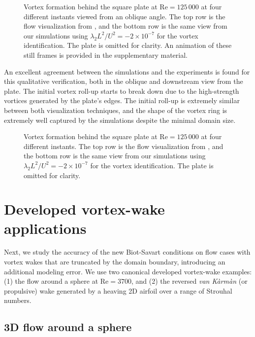 \documentclass[final,1p,times]{elsarticle}
\begin{document}
\begin{figure}
    \centering
    \def\svgwidth{1\columnwidth}
    
    \caption{Vortex formation behind the square plate at $\text{Re}=125\,000$ at four different instants viewed from an oblique angle. The top row is the flow visualization from \cite{Higuchi1996Three-dimensionalPlates}, and the bottom row is the same view from our simulations using $\lambda_2L^2/U^2=-2\times10^{-7}$ for the vortex identification. The plate is omitted for clarity. An animation of these still frames is provided in the supplementary material.}
    \label{fig:square_disk_comparison_oblique}
\end{figure}
An excellent agreement between the simulations and the experiments is found for this qualitative verification, both in the oblique and downstream view from the plate. The initial vortex roll-up starts to break down due to the high-strength vortices generated by the plate's edges. The initial roll-up is extremely similar between both visualization techniques, and the shape of the vortex ring is extremely well captured by the simulations despite the minimal domain size.
\begin{figure}
    \centering
    \def\svgwidth{1\columnwidth}
    
    \caption{Vortex formation behind the square plate at $\text{Re}=125\,000$ at four different instants. The top row is the flow visualization from \cite{Higuchi1996Three-dimensionalPlates}, and the bottom row is the same view from our simulations using $\lambda_2L^2/U^2=-2\times10^{-7}$ for the vortex identification. The plate is omitted for clarity.}
    \label{fig:square_disk_comparison}
\end{figure}

\section{Developed vortex-wake applications}

Next, we study the accuracy of the new Biot-Savart conditions on flow cases with vortex wakes that are truncated by the domain boundary, introducing an additional modeling error. We use two canonical developed vortex-wake examples: (1) the flow around a sphere at $\text{Re}=3700$, and (2) the reversed \emph{van K\`arm\`an} (or propulsive) wake generated by a heaving 2D airfoil over a range of Strouhal numbers.

\subsection{3D flow around a sphere}
\end{document}
